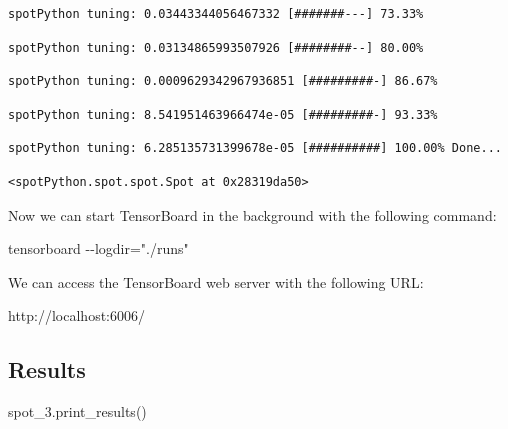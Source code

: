 \documentclass[
  letterpaper,
  DIV=11,
  numbers=noendperiod]{scrreprt}
\newenvironment{Shaded}{\begin{snugshade}}{\end{snugshade}}
\newcommand{\NormalTok}[1]{\textcolor[rgb]{0.00,0.23,0.31}{#1}}
\begin{document}
\begin{verbatim}
spotPython tuning: 0.03443344056467332 [#######---] 73.33% 
\end{verbatim}

\begin{verbatim}
spotPython tuning: 0.03134865993507926 [########--] 80.00% 
\end{verbatim}

\begin{verbatim}
spotPython tuning: 0.0009629342967936851 [#########-] 86.67% 
\end{verbatim}

\begin{verbatim}
spotPython tuning: 8.541951463966474e-05 [#########-] 93.33% 
\end{verbatim}

\begin{verbatim}
spotPython tuning: 6.285135731399678e-05 [##########] 100.00% Done...
\end{verbatim}

\begin{verbatim}
<spotPython.spot.spot.Spot at 0x28319da50>
\end{verbatim}

Now we can start TensorBoard in the background with the following
command:

\begin{Shaded}
\begin{Highlighting}[]
\NormalTok{tensorboard {-}{-}logdir="./runs"}
\end{Highlighting}
\end{Shaded}

We can access the TensorBoard web server with the following URL:

\begin{Shaded}
\begin{Highlighting}[]
\NormalTok{http://localhost:6006/}
\end{Highlighting}
\end{Shaded}

\hypertarget{results}{%
\subsection{Results}\label{results}}

\begin{Shaded}
\begin{Highlighting}[]
\NormalTok{spot\_3.print\_results()}
\end{Highlighting}
\end{Shaded}
\end{document}
